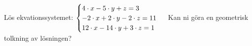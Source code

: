 Lös ekvationssystemet:
\begin{math}
	\begin{cases}
	4 \cdot x - 5 \cdot y  + z = 3 \\
	-2 \cdot x + 2 \cdot y - 2 \cdot z = 11 \\
	12 \cdot x - 14 \cdot y  + 3 \cdot z = 1 \\
	\end{cases}
	\\
	\\
\end{math}
Kan ni göra en geometrisk tolkning av lösningen?